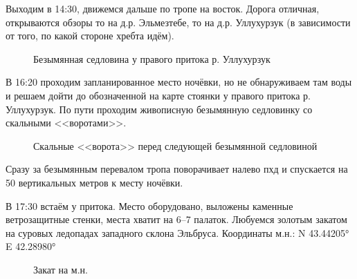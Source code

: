 Выходим в 14:30, движемся дальше по тропе на восток. Дорога отличная, открываются обзоры то на д.р. Эльмезтебе, то на д.р. Уллухурзук (в зависимости от того, по какой стороне хребта идём). 

\begin{figure}[h!]
	\centering
	\caption{Безымянная седловина у правого притока р. Уллухурзук}
	\label{fig:saddle}
\end{figure}


В 16:20 проходим запланированное место ночёвки, но не обнаруживаем там воды и решаем дойти до обозначенной на карте стоянки у правого притока р. Уллухурзук. По пути проходим живописную безымянную седловинку со скальными <<воротами>>.

\begin{figure}[h!]
	\centering
	\caption{Скальные <<ворота>> перед следующей безымянной седловиной}
	\label{fig:gate}
\end{figure}
 
Сразу за безымянным перевалом тропа поворачивает налево пхд и спускается на 50 вертикальных метров к месту ночёвки.

В 17:30 встаём у притока. Место оборудовано, выложены каменные ветрозащитные стенки, места хватит на 6--7 палаток. Любуемся золотым закатом на суровых ледопадах западного склона Эльбруса. Координаты м.н.: N 43.44205° E 42.28980°

\begin{figure}[h!]
	\centering
	\caption{Закат на м.н.}
	\label{fig:camp06}
\end{figure}

\clearpage
